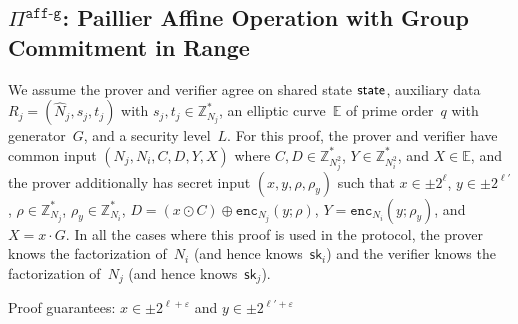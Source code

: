 \documentclass[11pt]{article}
\def\state{{\sf state}}
\newcommand{\enc}{\ensuremath{\mathtt{enc}}}
\newcommand{\proof}[1]{\ensuremath{\Pi^{\mathtt{#1}}}}
\newcommand{\sk}{\textsf{sk}}
\newcommand{\E}{\mathbb{E}}
\newcommand{\Z}{\mathbb{Z}}
\newcommand{\?}[1]{\stackrel{?}{#1}}
\begin{document}
\subsection{\proof{aff\mbox{-}g}: Paillier Affine Operation with Group Commitment in Range}


We assume the prover and verifier agree on shared state $\state$, auxiliary data $R_j = (\hat N_j, s_j, t_j)$ with $s_j, t_j \in \Z^*_{N_j}$,
an elliptic curve~$\E$ of prime order~$q$ with generator~$G$,
and a security level~$L$.
For this proof, the prover and verifier have common input 
$(N_j, N_i, C, D, Y, X)$ 
where $C, D \in \Z^*_{N_j^2}$, 
$Y \in \Z^*_{N_i^2}$, and
$X \in \E$, and the prover additionally has secret input 
$(x, y, \rho, \rho_y)$ such that 
$x \in \pm 2^\ell$, 
$y \in \pm 2^{\ell'}$, 
$\rho \in \Z^*_{N_j}$, 
$\rho_y \in \Z^*_{N_i}$,  
$D = (x \odot C) \oplus \enc_{N_j}(y; \rho)$, 
$Y = \enc_{N_i}(y; \rho_y)$,
and $X = x \cdot G$.
In all the cases where this proof is used in the protocol, the prover knows the factorization of~$N_i$ (and hence knows~$\sk_i$) and the verifier knows the factorization of~$N_j$ (and hence knows~$\sk_j$).

Proof guarantees: $x \in \pm 2^{\ell + \varepsilon}$ and $y \in \pm 2^{\ell' + \varepsilon}$
\end{document}
